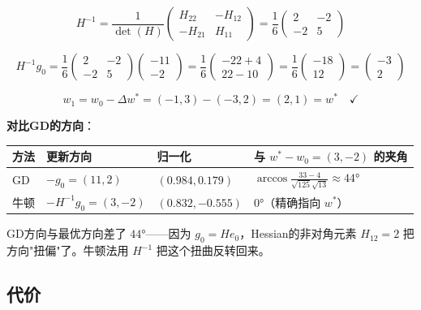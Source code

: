 \documentclass[12pt,a4paper]{article}
\begin{document}
\[H^{-1} = \frac{1}{\det(H)}\begin{pmatrix}H_{22}&-H_{12}\\-H_{21}&H_{11}\end{pmatrix} = \frac{1}{6}\begin{pmatrix}2&-2\\-2&5\end{pmatrix}\]


\[H^{-1}g_0 = \frac{1}{6}\begin{pmatrix}2&-2\\-2&5\end{pmatrix}\begin{pmatrix}-11\\-2\end{pmatrix} = \frac{1}{6}\begin{pmatrix}-22+4\\22-10\end{pmatrix} = \frac{1}{6}\begin{pmatrix}-18\\12\end{pmatrix} = \begin{pmatrix}-3\\2\end{pmatrix}\]


\[w_1 = w_0 - \Delta w^* = (-1, 3) - (-3, 2) = (2, 1) = w^* \quad \checkmark\]

\textbf{对比GD的方向}：





\begin{center}\small
\begin{longtable}{|l|l|l|l|}
\hline
方法 & 更新方向 & 归一化 & 与 $w^*-w_0=(3,-2)$ 的夹角 \\
\hline
GD & $-g_0 = (11, 2)$ & $(0.984, 0.179)$ & $\arccos\frac{33-4}{\sqrt{125}\sqrt{13}} \approx 44°$ \\
牛顿 & $-H^{-1}g_0 = (3, -2)$ & $(0.832, -0.555)$ & $0°$（精确指向 $w^*$） \\
\hline
\end{longtable}
\end{center}


GD方向与最优方向差了 $44°$——因为 $g_0 = He_0$，Hessian的非对角元素 $H_{12}=2$ 把方向"扭偏"了。牛顿法用 $H^{-1}$ 把这个扭曲反转回来。


\subsection{代价}
\end{document}
